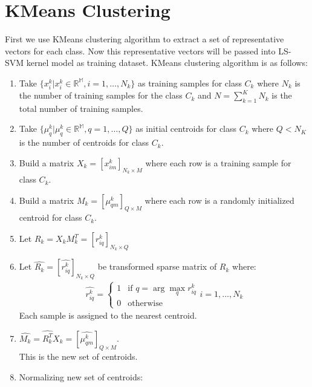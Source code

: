 \documentclass[conference]{IEEEtran}
\begin{document}


    \section{KMeans Clustering}\label{sec:kmeans-clustering}
    First we use KMeans clustering algorithm to extract a set of representative vectors for each class.
    Now this representative vectors will be passed into LS-SVM kernel model as training dataset.
    KMeans clustering algorithm is as follows:
    \begin{enumerate}
        \item Take $\{x_{i}^{k}|x_{i}^{k} \in \mathbb{R^{M}}, i=1,\ldots,N_{k}\}$ as training samples for class $C_{k}$ where
        $N_{k}$ is the number of training samples for the class $C_{k}$ and $N = \sum_{k=1}^{K}N_{k}$ is the total
        number of training samples.
        \item Take $\{\mu_{q}^{k}|\mu_{q}^{k} \in \mathbb{R^{M}}, q=1,\ldots,Q \}$ as initial centroids
        for class $C_{k}$ where $Q<N_{K}$ is the number of centroids for class $C_{k}$.
        \item Build a matrix $X_{k} = [x_{im}^{k}]_{N_{k} \times M}$ where each row is a training sample for class $C_{k}$.
        \item Build a matrix $M_{k} = [\mu_{qm}^{k}]_{Q \times M}$ where each row is a randomly initialized centroid
        for class $C_{k}$.
        \item Let $R_{k} = X_{k}M_{k}^{T} = [r_{iq}^{k}]_{N_{k}\times Q}$
        \item Let $\hat{R_{k}} = [\hat{r_{iq}^{k}}]_{N_{k}\times Q}$ be transformed sparse matrix of $R_{k}$ where:
        \begin{align*}
        \hat{r_{iq}^{k}} = \begin{cases}
                                1 & \text{if } q = \arg \max_{q}r_{iq}^{k} \\
                                0 & \text{otherwise}
        \end{cases}
        i = 1,\ldots,N_{k}
        \end{align*}
        Each sample is assigned to the nearest centroid.
        \item $\hat{M_{k}} = \hat{R_{k}^{T}}X_{k} = [\hat{\mu_{qm}^{k}}]_{Q \times M}$. \\
        This is the new set of centroids.
        \item Normalizing new set of centroids:

\end{enumerate}
\end{document}
